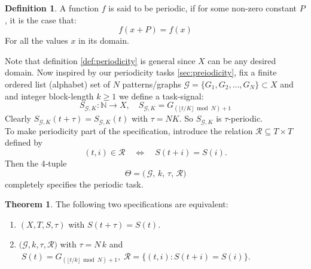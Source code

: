 \documentclass{article}
\theoremstyle{remark}
\theoremstyle{definition}
\newtheorem{definition}{Definition}
\newtheorem{theorem}{Theorem}[section]
\begin{document}
\begin{definition}
A function $f$ is said to be periodic, if for some non-zero constant $P$, it is the case that:
$$
f(x+P) = f(x)
$$
For all the values $x$ in its domain.

\end{definition} \label{def:periodicity}

Note that definition \ref{def:periodicity} is general since $X$ can be any desired domain. Now inspired by our periodicity tasks \ref{sec:preiodicity}, fix a finite ordered list (alphabet) set of $N$ patterns/graphs $\mathcal{G} = \{G_1, G_2, \ldots, G_N\} \subset X$ and and integer block-length $k \geq 1$ we define a task-signal:
\[
S_{\mathcal{G}, K}: \mathbb{N} \rightarrow X, \quad S_{\mathcal{G}, K} = G_{(\lfloor t/K\rfloor \bmod N) + 1}
\]
Clearly $S_{\mathcal{G}, K} (t + \tau) = S_{\mathcal{G}, K} (t)$ with $\tau = NK$.
So $S_{\mathcal{G}, K}$ is $\tau$-periodic.\\
To make periodicity part of the specification, introduce the relation
\(\mathcal{R}\subseteq T\times T\) defined by
\[
  (t,i)\in\mathcal{R}
  \quad\Longleftrightarrow\quad
  S(t+i)=S(i).
\]
Then the 4‐tuple
\[
  \Theta
  = \bigl(\,\mathcal{G},\,k,\,\tau,\,\mathcal{R}\bigr)
\]
completely specifies the periodic task.


\begin{theorem}
    The following two specifications are equivalent:
\begin{enumerate}
  \item $(X,T,S,\tau)$ with \(S(t+\tau)=S(t)\).  
  \item $(\mathcal{G},k,\tau,\mathcal{R}\bigr)$ with
  \(\tau=N\,k\) and
  \(\;S(t)=G_{(\lfloor t/k\rfloor\bmod N)+1},\;\mathcal{R}=\{(t,i):S(t+i)=S(i)\}.\)
\end{enumerate}
\end{theorem}
\end{document}
